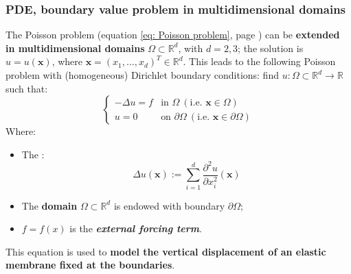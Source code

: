 \subsubsection{PDE, boundary value problem in multidimensional domains}

The Poisson problem (equation \ref{eq: Poisson problem}, page \pageref{eq: Poisson problem}) can be \textbf{extended in multidimensional domains} $\Omega \subset \mathbb{R}^{d}$, with $d = 2, 3$; the solution is $u = u\left(\mathbf{x}\right)$, where $\mathbf{x} = \left(x_{1}, \dots, x_{d}\right)^{T} \in \mathbb{R}^{d}$. This leads to the following Poisson problem with (homogeneous) Dirichlet boundary conditions: find $u: \Omega \subset \mathbb{R}^{d} \rightarrow \mathbb{R}$ such that:
\begin{equation}
    \begin{cases}
        -\Delta u = f   & \text{in } \Omega \: \left(\text{i.e. } \mathbf{x} \in \Omega\right) \\
        u = 0           & \text{on } \partial\Omega \: \left(\text{i.e. } \mathbf{x} \in \partial\Omega\right)
    \end{cases}
\end{equation}
Where:
\begin{itemize}
    \item The :
    \begin{equation*}
        \Delta u \left(\mathbf{x}\right) := \displaystyle\sum_{i=1}^{d} \dfrac{\partial^{2} u}{\partial x_{i}^{2}}\left(\mathbf{x}\right)
    \end{equation*}

    \item The \textbf{domain} $\Omega \subset \mathbb{R}^{d}$ is endowed with boundary $\partial \Omega$;

    \item $f = f\left(x\right)$ is the \emph{\textbf{external forcing term}}.
\end{itemize}
This equation is used  to \textbf{model the vertical displacement of an elastic membrane fixed at the boundaries}.